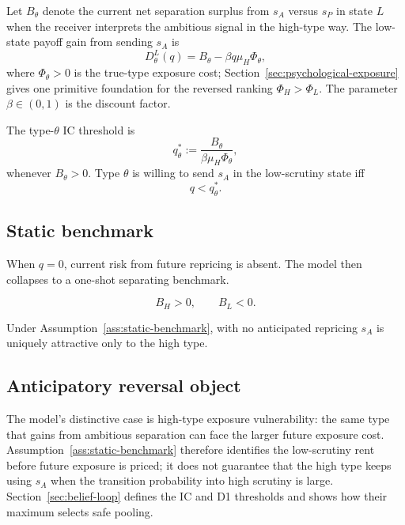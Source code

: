 Let $B_\theta$ denote the current net separation surplus from $s_A$ versus $s_P$ in state $L$ when the receiver interprets the ambitious signal in the high-type way. The low-state payoff gain from sending $s_A$ is
\[
D_\theta^L(q)=B_\theta-\beta q\mu_H\Phi_\theta,
\]
where $\Phi_\theta>0$ is the true-type exposure cost; Section~\ref{sec:psychological-exposure} gives one primitive foundation for the reversed ranking \(\Phi_H>\Phi_L\). The parameter $\beta\in(0,1)$ is the discount factor.

The type-$\theta$ IC threshold is
\[
q_\theta^*:=\frac{B_\theta}{\beta\mu_H\Phi_\theta},
\]
whenever $B_\theta>0$. Type $\theta$ is willing to send $s_A$ in the low-scrutiny state iff
\[
q<q_\theta^*.
\]

\subsection{Static benchmark}

When $q=0$, current risk from future repricing is absent. The model then collapses to a one-shot separating benchmark.

\begin{assumption}
\label{ass:static-benchmark}
\[
B_H>0,\qquad B_L<0.
\]
\end{assumption}

Under Assumption~\ref{ass:static-benchmark}, with no anticipated repricing $s_A$ is uniquely attractive only to the high type.

\subsection{Anticipatory reversal object}

The model's distinctive case is high-type exposure vulnerability: the same type that gains from ambitious separation can face the larger future exposure cost. Assumption~\ref{ass:static-benchmark} therefore identifies the low-scrutiny rent before future exposure is priced; it does not guarantee that the high type keeps using \(s_A\) when the transition probability into high scrutiny is large. Section~\ref{sec:belief-loop} defines the IC and D1 thresholds and shows how their maximum selects safe pooling.
